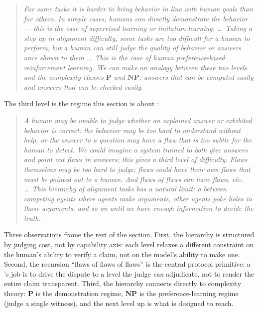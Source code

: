 \begin{quote}\itshape
For some tasks it is harder to bring behavior in line with human goals
than for others. In simple cases, humans can directly demonstrate the
behavior --- this is the case of supervised learning or imitation
learning. \ldots\ Taking a step up in alignment difficulty, some tasks
are too difficult for a human to perform, but a human can still judge
the quality of behavior or answers once shown to them \ldots\ This is
the case of human preference-based reinforcement learning. We can make
an analogy between these two levels and the complexity classes
$\mathbf{P}$ and $\mathbf{NP}$: answers that can be computed easily
and answers that can be checked easily.
\end{quote}

The third level is the regime this section is about
\citep[\S 1]{irving2018-debate}:

\begin{quote}\itshape
A human may be unable to judge whether an explained answer or
exhibited behavior is correct: the behavior may be too hard to
understand without help, or the answer to a question may have a flaw
that is too subtle for the human to detect. We could imagine a system
trained to both give answers and point out flaws in answers; this gives
a third level of difficulty. Flaws themselves may be too hard to judge:
flaws could have their own flaws that must be pointed out to a human.
And flaws of flaws can have flaws, etc. \ldots\ This hierarchy of
alignment tasks has a natural limit: a  between competing agents
where agents make arguments, other agents poke holes in those arguments,
and so on until we have enough information to decide the truth.
\end{quote}

Three observations frame the rest of the section. First, the hierarchy
is structured by judging cost, not by capability axis: each level
relaxes a different constraint on the human's ability to verify a
claim, not on the model's ability to make one. Second, the recursion
``flaws of flaws of flaws'' is the central protocol primitive: a
's job is to drive the dispute to a level the judge \emph{can}
adjudicate, not to render the entire claim transparent. Third, the
hierarchy connects directly to complexity theory: $\mathbf{P}$ is the
demonstration regime, $\mathbf{NP}$ is the preference-learning regime
(judge a single witness), and the next level up is what  is
designed to reach.

